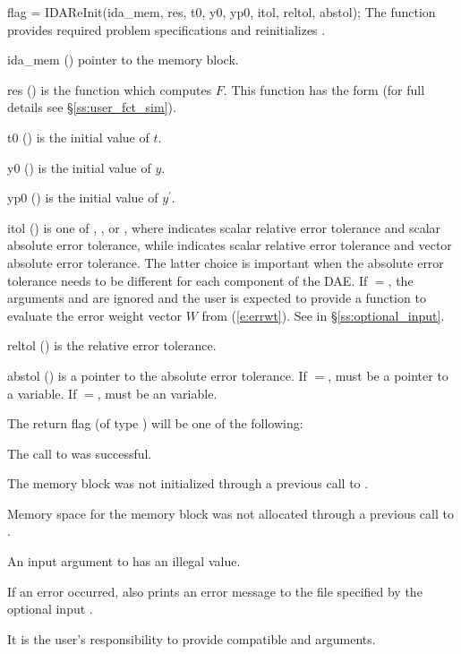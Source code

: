 {
  flag = IDAReInit(ida\_mem, res, t0, y0, yp0, itol, reltol, abstol);
}
{
  The function  provides required problem specifications 
  and reinitializes {\ida}.
}
{
  \begin{args}
  \item[ida\_mem] ()
    pointer to the {\ida} memory block.
  \item[res] ()
    is the {\C} function which computes $F$. This function has the form 
     (for full details see \S\ref{ss:user_fct_sim}).
  \item[t0] ()
    is the initial value of $t$.
  \item[y0] ()
    is the initial value of $y$. 
  \item[yp0] ()
    is the initial value of $y^\prime$.   
  \item[itol] () 
    is one of , , or , where 
    indicates scalar relative error tolerance and scalar absolute error tolerance, 
    while  indicates scalar relative error tolerance and vector 
    absolute error tolerance.  The latter choice is important when the absolute 
    error tolerance needs to be different for each component of the DAE. 
    If $=$, the arguments  and  are ignored
    and the user is expected to provide a function to evaluate the error weight vector
    $W$ from (\ref{e:errwt}). See  in \S\ref{ss:optional_input}.
  \item[reltol] ()
    is the relative error tolerance.
  \item[abstol] ()
    is a pointer to the absolute error tolerance. If $=$,
     must be a pointer to a  variable. If
   $=$,  must be an  variable.
  \end{args}
}
{
  The return flag  (of type ) will be one of the following:
  \begin{args}
  \item[\Id{IDA\_SUCCESS}]
    The call to  was successful.
  \item[\Id{IDA\_MEM\_NULL}] 
    The {\ida} memory block was not initialized through a 
    previous call to .
  \item[\Id{IDA\_NO\_MALLOC}] 
    Memory space for the {\ida} memory block was not allocated through a 
    previous call to .
  \item[\Id{IDA\_ILL\_INPUT}] 
    An input argument to  has an illegal value.
  \end{args}
}
{
  If an error occurred,  also prints an error message to the
  file specified by the optional input .

  {\warn} It is the user's responsibility to provide compatible  and
   arguments.
}


